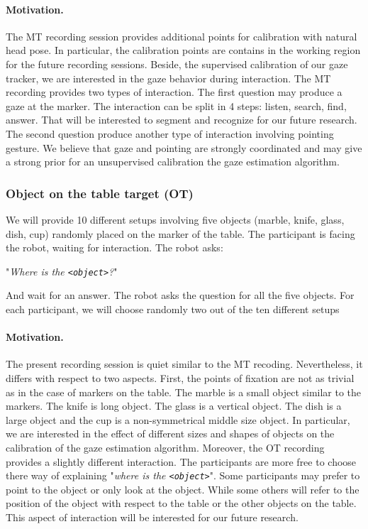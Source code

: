 \documentclass[11pt,a4paper]{article}
\begin{document}
\paragraph{Motivation.}
The MT recording session provides additional points for calibration with natural head pose. In particular, the calibration points are contains in the working region for the future recording sessions. Beside, the supervised calibration of our gaze tracker, we are interested in the gaze behavior during interaction. The MT recording provides two types of interaction. The first question may produce a gaze at the marker. The interaction can be split in 4 steps: listen, search, find, answer. That will be interested to segment and recognize for our future research. The second question produce another type of interaction involving pointing gesture. We believe that gaze and pointing  are strongly coordinated and may give a strong prior for an unsupervised calibration the gaze estimation algorithm.
 
\subsubsection{Object on the table target (OT)}
We will provide 10 different setups involving five objects (marble, knife, glass, dish, cup) randomly placed on the marker of the table. The participant is facing the robot, waiting for interaction. The robot asks: 
\begin{center}
"\textit{Where is the \texttt{<object>}?}"
\end{center}
And wait for an answer. The robot asks the question for all the five objects. For each participant, we will choose randomly two out of the ten different setups
\paragraph{Motivation.} 
The present recording session is quiet similar to the MT recoding. Nevertheless, it differs with respect to two aspects. First, the points of fixation are not as trivial as in the case of markers on the table. The marble is a small object similar to the markers. The knife is long object. The glass is a vertical object. The dish is a large object and the cup is a non-symmetrical middle size object. In particular, we are interested in the effect of different sizes and shapes of objects on the calibration of the gaze estimation algorithm. Moreover, the OT recording provides a slightly different interaction. The participants are more free to choose there way of explaining "\textit{where is the \texttt{<object>}}". Some participants may prefer to point to the object or only look at the object. While some others will refer to the position of the object with respect to the table or the other objects on the table. This aspect of interaction will be interested for our future research. 
\end{document}
